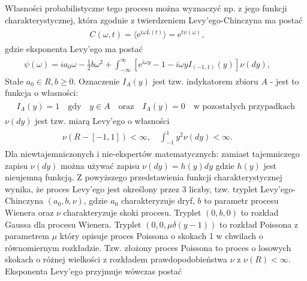 \documentclass[a4paper,12pt,polish]{sphinxmanual}
\begin{document}
Własności probabilistyczne tego procesu można wyznaczyć np. z jego funkcji charakterystycznej, która zgodnie z twierdzeniem Levy'ego-Chinczyna ma postać
\label{ch3/chIII021:equation-eqn51}\begin{gather}
\begin{split}C(\omega, t) = \langle \mbox{e}^{i\omega L(t)} \rangle = \mbox{e}^{t \psi(\omega)}, \qquad\end{split}\label{ch3/chIII021-eqn51}
\end{gather}
gdzie eksponenta Levy'ego ma postać
\label{ch3/chIII021:equation-eqn52}\begin{gather}
\begin{split}\psi(\omega) = ia_0 \omega -\frac{1}{2} b \omega^2+\int_{-\infty}^{\infty} \left[\mbox{e}^{i\omega y} - 1 - i\omega y I_{(-1,1)}(y) \right] \nu (dy), \qquad\end{split}\label{ch3/chIII021-eqn52}
\end{gather}
Stałe $a_0\in R, b \ge 0$. Oznaczenie $I_A(y)$ jest tzw. indykatorem zbioru $A$ - jest to funkcja o własności:
\label{ch3/chIII021:equation-eqn53}\begin{gather}
\begin{split} I_A(y) =1 \quad \mbox{gdy} \quad y\in A \quad \mbox{oraz} \quad I_A(y) = 0 \quad \mbox{w pozostałych przypadkach}\end{split}\label{ch3/chIII021-eqn53}
\end{gather}
$\nu(dy)$ jest tzw. miarą Levy'ego o własności
\label{ch3/chIII021:equation-eqn54}\begin{gather}
\begin{split}\nu (R-[-1, 1]) < \infty, \quad \int_{-1}^1 y^2 \nu(dy) < \infty. \qquad\end{split}\label{ch3/chIII021-eqn54}
\end{gather}
Dla niewtajemniczonych i nie-ekspertów matematycznych: zamiast tajemniczego zapisu $\nu(dy)$ można używać zapisu $\nu(dy) = h(y) dy$ gdzie $h(y)$ jest nieujemną funkcją. Z powyższego przedstawienia funkcji charakterystycznej wynika, że proces Levy'ego jest określony przez 3 liczby, tzw. tryplet Levy'ego-Chinczyna $(a_0, b, \nu)$, gdzie $a_0$ charakteryzuje dryf, $b$ to parametr procesu Wienera oraz $\nu$ charakteryzuje skoki procesu. Tryplet $(0, b, 0)$ to rozkład Gaussa dla procesu Wienera. Tryplet $(0, 0, \mu \delta(y-1))$ to rozkład Poissona z parametrem $\mu$ który opisuje proces Poissona o skokach 1 w chwilach o równomiernym rozkładzie. Tzw. złożony proces Poissona to proces o losowych skokach o różnej wielkości z rozkładem prawdopodobieństwa $\nu$ z $\nu(R) <\infty$. Eksponenta Levy'ego przyjmuje wówczas postać
\end{document}
